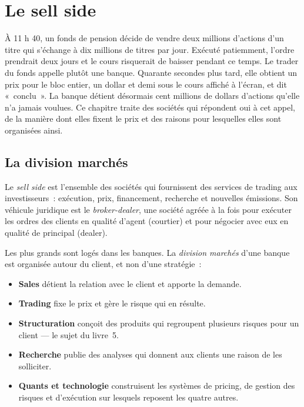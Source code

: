 \chapter{Le sell side}\label{ch:m1:the-sell-side}

À 11 h 40, un fonds de pension décide de vendre deux millions d'actions d'un titre qui
s'échange à dix millions de titres par jour. Exécuté patiemment, l'ordre prendrait deux jours et
le cours risquerait de baisser pendant ce temps. Le trader du fonds appelle plutôt une banque.
Quarante secondes plus tard, elle obtient un prix pour le bloc entier, un dollar et demi
sous le cours affiché à l'écran, et dit «~conclu~». La banque détient désormais cent millions
de dollars d'actions qu'elle n'a jamais voulues. Ce chapitre traite des sociétés qui
répondent oui à cet appel, de la manière dont elles fixent le prix et des raisons
pour lesquelles elles sont organisées ainsi.

\section{La division marchés}

\begin{definition}\label{def:m1:the-sell-side:sell-side}
Le \emph{sell side} est l'ensemble des sociétés qui fournissent des
services de trading aux investisseurs~: exécution, prix, financement, recherche et nouvelles
émissions. Son véhicule juridique est le \emph{broker-dealer}, une
société agréée à la fois pour exécuter les ordres des clients en qualité d'agent (courtier) et
pour négocier avec eux en qualité de principal (dealer).
\end{definition}

Les plus grands  sont logés dans les banques. La \emph{division
marchés} d'une banque est organisée autour du client, et non d'une stratégie~:

\begin{itemize}
\item \textbf{Sales} détient la relation avec le client et apporte la demande.
\item \textbf{Trading} fixe le prix et gère le risque qui en résulte.
\item \textbf{Structuration} conçoit des produits qui regroupent plusieurs risques pour un
  client --- le sujet du livre~5.
\item \textbf{Recherche} publie des analyses qui donnent aux clients une raison de
  les solliciter.
\item \textbf{Quants et technologie} construisent les systèmes de pricing, de gestion des risques et d'exécution
  sur lesquels reposent les quatre autres.
\end{itemize}

